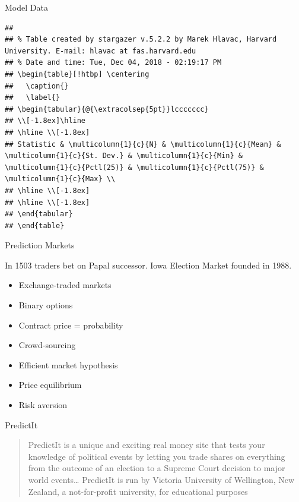 \documentclass[ignorenonframetext,]{beamer}
\providecommand{\tightlist}{%
  \setlength{\itemsep}{0pt}\setlength{\parskip}{0pt}}
\begin{document}
\begin{frame}[fragile]{Model Data}

\begin{verbatim}
## 
## % Table created by stargazer v.5.2.2 by Marek Hlavac, Harvard University. E-mail: hlavac at fas.harvard.edu
## % Date and time: Tue, Dec 04, 2018 - 02:19:17 PM
## \begin{table}[!htbp] \centering 
##   \caption{} 
##   \label{} 
## \begin{tabular}{@{\extracolsep{5pt}}lccccccc} 
## \\[-1.8ex]\hline 
## \hline \\[-1.8ex] 
## Statistic & \multicolumn{1}{c}{N} & \multicolumn{1}{c}{Mean} & \multicolumn{1}{c}{St. Dev.} & \multicolumn{1}{c}{Min} & \multicolumn{1}{c}{Pctl(25)} & \multicolumn{1}{c}{Pctl(75)} & \multicolumn{1}{c}{Max} \\ 
## \hline \\[-1.8ex] 
## \hline \\[-1.8ex] 
## \end{tabular} 
## \end{table}
\end{verbatim}

\end{frame}

\begin{frame}{Prediction Markets}

In 1503 traders bet on Papal successor. Iowa Election Market founded in
1988.

\begin{itemize}
\tightlist
\item
  Exchange-traded markets
\item
  Binary options
\item
  Contract price = probability
\item
  Crowd-sourcing
\item
  Efficient market hypothesis
\item
  Price equilibrium
\item
  Risk aversion
\end{itemize}

\end{frame}

\begin{frame}{PredictIt}

\begin{quote}
PredictIt is a unique and exciting real money site that tests your
knowledge of political events by letting you trade shares on everything
from the outcome of an election to a Supreme Court decision to major
world events\ldots{} PredictIt is run by Victoria University of
Wellington, New Zealand, a not-for-profit university, for educational
purposes
\end{quote}

\end{frame}
\end{document}
